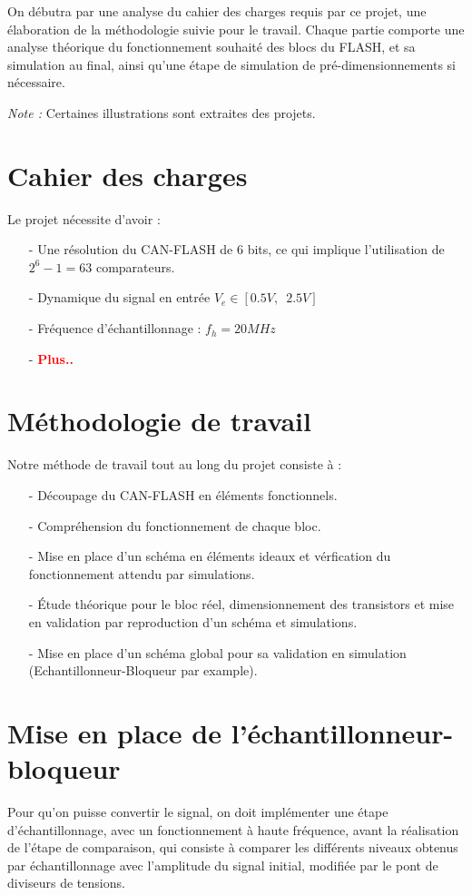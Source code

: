 \documentclass[11pt]{article}
\begin{document}
On d\'ebutra par une analyse du cahier des charges requis par ce projet, une \'elaboration de la m\'ethodologie suivie pour le travail. Chaque partie comporte une analyse th\'eorique du fonctionnement souhait\'e des blocs du FLASH, et sa simulation au final, ainsi qu'une \'etape de simulation de pr\'e-dimensionnements si n\'ecessaire.

\textit{Note :} Certaines illustrations sont extraites des projets.

\section{Cahier des charges}
Le projet n\'ecessite d'avoir :
\begin{itemize}
\item[-] Une r\'esolution du CAN-FLASH de 6 bits, ce qui implique l'utilisation de $2^{6} -1 = 63 $ comparateurs.
\item[-] Dynamique du signal en entr\'ee $V_e \in [0.5 V,\phantom{2} 2.5V]$
\item[-] Fr\'equence d'\'echantillonnage : $f_h = 20 MHz $
\item[-] \textbf{\textcolor{red}{Plus..}}
\end{itemize}

\section{M\'ethodologie de travail}
Notre m\'ethode de travail tout au long du projet consiste \`a :
\begin{itemize}
  \item[-] D\'ecoupage du CAN-FLASH en \'el\'ements fonctionnels.
  \item[-] Compr\'ehension du fonctionnement de chaque bloc.
  \item[-] Mise en place d'un sch\'ema en \'el\'ements ideaux et v\'erfication du fonctionnement attendu par simulations.
  \item[-] \'Etude th\'eorique pour le bloc r\'eel, dimensionnement des transistors et mise en validation par reproduction
  d'un sch\'ema et simulations.
  \item[-] Mise en place d'un sch\'ema global pour sa validation en simulation (Echantillonneur-Bloqueur par example).
\end{itemize}

\clearpage

\section{Mise en place de l'\'echantillonneur-bloqueur}
Pour qu'on puisse convertir le signal, on doit impl\'ementer une \'etape d'\'echantillonnage, avec un fonctionnement \`a haute fr\'equence,
avant la r\'ealisation de l'\'etape de comparaison, qui consiste \`a comparer les diff\'erents niveaux obtenus par \'echantillonnage avec l'amplitude du signal initial,
modifi\'ee par le pont de diviseurs de tensions.
\end{document}
